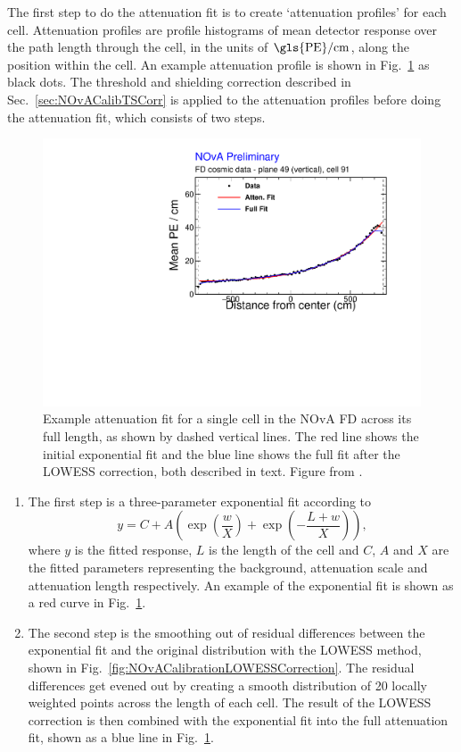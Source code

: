 The first step to do the attenuation fit is to create `attenuation profiles' for each cell. Attenuation profiles are profile histograms of mean detector response over the path length through the cell, in the units of $\unit{\gls{PE}/cm}$, along the position within the cell. An example attenuation profile is shown in Fig.~\ref{fig:NOvACalibrationAttenuationFit} as black dots. The threshold and shielding correction described in Sec.~\ref{sec:NOvACalibTSCorr} is applied to the attenuation profiles before doing the attenuation fit, which consists of two steps.

\begin{figure}
    \centering
    \includegraphics[width=.7\textwidth]{Plots/NOvAExperiment/ExampleAttenuationFit.pdf}
    \caption[Example attenuation fit for NOvA relative calibration]{Example attenuation fit for a single cell in the \acrshort{NOvA} \acrshort{FD} across its full length, as shown by dashed vertical lines. The red line shows the initial exponential fit and the blue line shows the full fit after the \acrshort{LOWESS} correction, both described in text. Figure from \cite{totfit_fd_datafitX_049_091.pdf}.}
    \label{fig:NOvACalibrationAttenuationFit}
\end{figure}

\begin{enumerate}
\item The first step is a three-parameter exponential fit according to
\begin{equation}\label{eq:NOvARelCalibExpFit}
y=C+A\left(\exp\left(\frac{w}{X}\right)+\exp\left(-\frac{L+w}{X}\right)\right),
\end{equation}
where $y$ is the fitted response, $L$ is the length of the cell and $C$, $A$ and $X$ are the fitted parameters representing the background, attenuation scale and attenuation length respectively. An example of the exponential fit is shown as a red curve in Fig.~\ref{fig:NOvACalibrationAttenuationFit}.
\item The second step is the smoothing out of residual differences between the exponential fit and the original distribution with the \gls{LOWESS} method, shown in Fig.~\ref{fig:NOvACalibrationLOWESSCorrection}. The residual differences get evened out by creating a smooth distribution of 20 locally weighted points across the length of each cell. The result of the \gls{LOWESS} correction is then combined with the exponential fit into the full attenuation fit, shown as a blue line in Fig.~\ref{fig:NOvACalibrationAttenuationFit}.
\end{enumerate}

